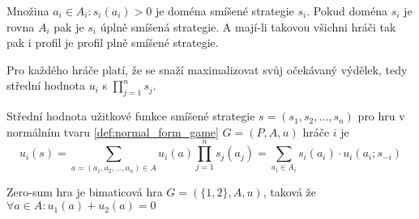 Množina ${a_i \in A_i : s_i(a_i) > 0}$ je doména smíšené strategie $s_i$. Pokud doména $s_i$ je rovna $A_i$ pak je $s_i$ úplně smíšená strategie. A mají-li takovou všichni hráči tak pak i profil je profil plně smíšené strategie. 

Pro každého hráče platí, že se snaží maximalizovat svůj očekávaný výdělek, tedy střední hodnota $u_i$ s $\prod^n_{j=1} s_j$. 
\begin{definition}
\label{def:expected_payoff}
Střední hodnota užitkové funkce smíšené strategie $s = (s_1, s_2, \dots, s_n)$ pro hru v normálním tvaru \ref{def:normal_form_game} $G= (P, A, u)$ hráče $i$ je 
\[
    u_i(s) = \sum_{a = (a_1, a_2, \dots, a_n) \in A} u_i(a) \prod_{j=1}^n s_j(a_j) = \sum_{a_i\in A_i} s_i(a_i) \cdot u_i(a_i; s_{-i})
\]
\end{definition}

\begin{definition}
\label{def:zero_sum}
Zero-sum hra je bimaticová hra $G = (\{1,2\}, A, u)$, taková že $\forall a \in A: u_1(a) + u_2(a) = 0$
\end{definition}
